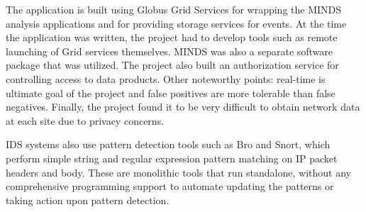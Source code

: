 
 The application is built using Globus Grid Services for wrapping the
 MINDS analysis applications and for providing storage services for
 events. At the time the application was written, the project had to
 develop tools such as remote launching of Grid services
 themselves. MINDS was also a separate software package that was
 utilized. The project also built an authorization service for
 controlling access to data products. Other noteworthy points:
 real-time is ultimate goal of the project and false positives are
 more tolerable than false negatives.  Finally, the project found it
 to be very difficult to obtain network data at each site due to
 privacy concerns.

 IDS systems also use pattern detection tools such as Bro and Snort,
 which perform simple string and regular expression pattern matching on
 IP packet headers and body. These are monolithic tools that run
 standalone, without any comprehensive programming support to automate
 updating the patterns or taking action upon pattern detection.

